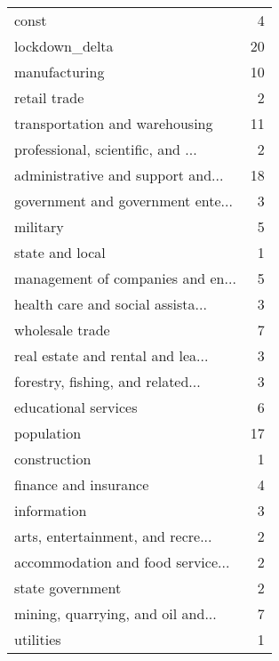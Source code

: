 \begin{tabular}{lr}
\hline
 const                             &  4 \\
 lockdown\_delta                    & 20 \\
 manufacturing                     & 10 \\
 retail trade                      &  2 \\
 transportation and warehousing    & 11 \\
 professional, scientific, and ... &  2 \\
 administrative and support and... & 18 \\
 government and government ente... &  3 \\
 military                          &  5 \\
 state and local                   &  1 \\
 management of companies and en... &  5 \\
 health care and social assista... &  3 \\
 wholesale trade                   &  7 \\
 real estate and rental and lea... &  3 \\
 forestry, fishing, and related... &  3 \\
 educational services              &  6 \\
 population                        & 17 \\
 construction                      &  1 \\
 finance and insurance             &  4 \\
 information                       &  3 \\
 arts, entertainment, and recre... &  2 \\
 accommodation and food service... &  2 \\
 state government                  &  2 \\
 mining, quarrying, and oil and... &  7 \\
 utilities                         &  1 \\
\hline
\end{tabular}